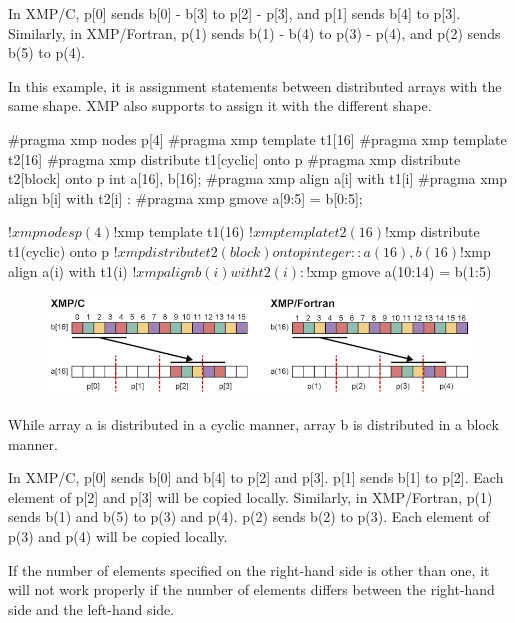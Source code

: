 In XMP/C, p[0] sends b[0] - b[3] to p[2] - p[3], and p[1] sends b[4] to
p[3]. Similarly, in XMP/Fortran, p(1) sends b(1) - b(4) to p(3) - p(4),
and p(2) sends b(5) to p(4).

In this example, it is assignment statements between distributed arrays
with the same shape. XMP also supports to assign it with the different
shape.

\begin{XCexample}
#pragma xmp nodes p[4]
#pragma xmp template t1[16]
#pragma xmp template t2[16]
#pragma xmp distribute t1[cyclic] onto p
#pragma xmp distribute t2[block] onto p
int a[16], b[16];
#pragma xmp align a[i] with t1[i]
#pragma xmp align b[i] with t2[i]
     :
#pragma xmp gmove
  a[9:5] = b[0:5];
\end{XCexample}

\begin{XFexample}
!$xmp nodes p(4)
!$xmp template t1(16)
!$xmp template t2(16)
!$xmp distribute t1(cyclic) onto p
!$xmp distribute t2(block) onto p
integer :: a(16), b(16)
!$xmp align a(i) with t1(i)
!$xmp align b(i) with t2(i)
     :
!$xmp gmove
  a(10:14) = b(1:5)
\end{XFexample}

\begin{figure}
  \centering
  \includegraphics{figs/gmove_cyclic.png}
\end{figure}

While array a is distributed in a cyclic manner, array b is distributed
in a block manner.

In XMP/C, p[0] sends b[0] and b[4] to p[2] and p[3]. p[1] sends b[1] to
p[2]. Each element of p[2] and p[3] will be copied locally. Similarly,
in XMP/Fortran, p(1) sends b(1) and b(5) to p(3) and p(4). p(2) sends
b(2) to p(3). Each element of p(3) and p(4) will be copied locally.

\begin{mynote}
If the number of elements specified on the
right-hand side is other than one, it will not work properly if the
  number of elements differs between the right-hand side and the
  left-hand side.
\end{mynote}

